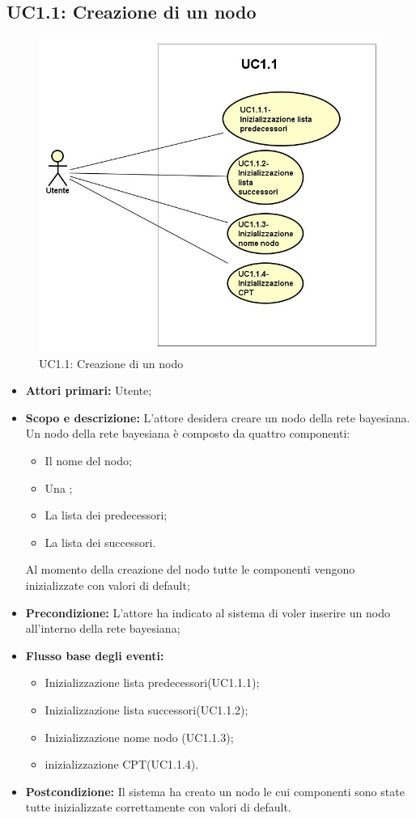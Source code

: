 \subsection{UC1.1: Creazione di un nodo} 
\begin{figure} [H]
	\centering
	\includegraphics[scale=0.45]{Img/UC1-1} 
	\caption{UC1.1: Creazione di un nodo} \label{} 
\end{figure} 
\begin{itemize} 
	\item{\textbf{Attori primari:} Utente;} 
	\item{\textbf{Scopo e descrizione:} L'attore desidera creare un nodo della rete bayesiana. Un nodo della rete bayesiana è composto da quattro componenti: 
	\begin{itemize} 
		\item{Il nome del nodo;} 
		\item{Una ;} 
		\item{La lista dei predecessori;} 
		\item{La lista dei successori.} 
	\end{itemize} 
Al momento della creazione del nodo tutte le componenti vengono inizializzate con valori di default;} 
	\item{\textbf{Precondizione:} L'attore ha indicato al sistema di voler inserire un nodo all'interno della rete bayesiana;} 
	\item{\textbf{Flusso base degli eventi:} } 
		\begin{itemize} 
			\item{Inizializzazione lista predecessori(UC1.1.1);} 
			\item{Inizializzazione lista successori(UC1.1.2);} 
			\item{Inizializzazione nome nodo (UC1.1.3);} 
			\item{inizializzazione CPT(UC1.1.4).} 
		\end{itemize} 
	\item{\textbf{Postcondizione:} Il sistema ha creato un nodo le cui componenti sono state tutte inizializzate correttamente con valori di default.} 
\end{itemize} 
